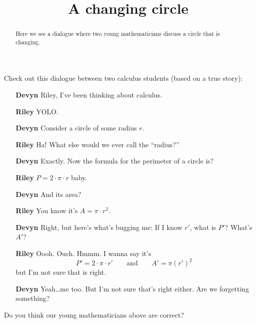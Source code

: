 \documentclass{ximera}
\title[Break-Ground:]{A changing circle}
\begin{document}
\begin{abstract}
Here we see a dialogue where two young mathematicians discuss a circle
that is changing.
\end{abstract}
\maketitle

Check out this dialogue between two calculus students (based on a true
story):

\begin{itemize}
  \item[\textbf{Devyn}] Riley, I've been thinking about calculus.   
  \item[\textbf{Riley}] YOLO.
  \item[\textbf{Devyn}] Consider a circle of some radius $r$.
  \item[\textbf{Riley}] Ha! What else would we ever call the ``radius?''
  \item[\textbf{Devyn}] Exactly. Now the formula for the perimeter of
    a circle is?
  \item[\textbf{Riley}] $P=2\cdot\pi \cdot r$ baby.
  \item[\textbf{Devyn}] And its area?
  \item[\textbf{Riley}] You know it's $A=\pi\cdot r^2$.
  \item[\textbf{Devyn}] Right, but here's what's bugging me: If I know
    $r'$, what is $P'$? What's $A'$?
  \item[\textbf{Riley}] Oooh. Ouch. Hmmm. I wanna say it's
    \[
    P' = 2\cdot\pi \cdot r' \qquad\text{and}\qquad  A' = \pi (r')^2 
    \]
    but I'm not sure that is right.
  \item[\textbf{Devyn}] Yeah\dots me too. But I'm not sure that's
    right either. Are we forgetting something?
\end{itemize}
  
\begin{problem}
  Do you think our young mathematicians above are correct?
  \begin{multipleChoice}
  \end{multipleChoice}
\end{problem}
\end{document}
